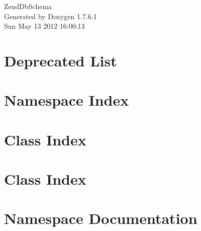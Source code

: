 \documentclass[a4paper]{book}
\begin{document}
\hypersetup{pageanchor=false,citecolor=blue}
\begin{titlepage}
\vspace*{7cm}
\begin{center}
{\Large \-Zend\-Db\-Schema }\\
\vspace*{1cm}
{\large \-Generated by Doxygen 1.7.6.1}\\
\vspace*{0.5cm}
{\small Sun May 13 2012 16:00:13}\\
\end{center}
\end{titlepage}
\clearemptydoublepage
{}
\tableofcontents
\clearemptydoublepage
{}
\hypersetup{pageanchor=true,citecolor=blue}
\chapter{\-Deprecated \-List}
\label{deprecated}
\hypertarget{deprecated}{}

\chapter{\-Namespace \-Index}

\chapter{\-Class \-Index}

\chapter{\-Class \-Index}

\chapter{\-Namespace \-Documentation}



\end{document}
